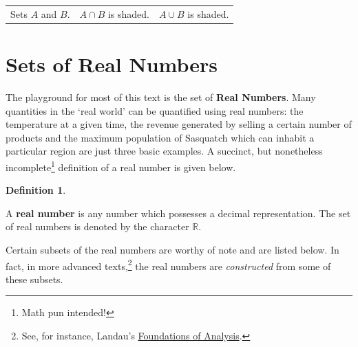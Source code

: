 \documentclass[11pt]{article}
\theoremstyle{definition}  %
\newtheorem{defn}{\bf Definition}
\newcommand{\bbm}{\begin{boxedminipage}{6.41in}}
\newcommand{\ebm}{\end{boxedminipage}}
\begin{document}
\begin{center}
\begin{tabular}{ccc}
\\

Sets $A$ and $B$. 



&

\hspace{0.15in}

$A \cap B$ is shaded.

&

\hspace{0.15in}

$A \cup B$ is shaded.

\\
\end{tabular}

\end{center}

\section{Sets of Real Numbers}
\label{SetsofRealNumbers}

The playground for most of this text is the set of \textbf{Real Numbers}.  Many quantities in the `real world' can be quantified using real numbers: the temperature at a given time, the revenue generated by selling a certain number of products and the maximum population of Sasquatch which can inhabit a particular region are just three basic examples.   A succinct, but nonetheless incomplete\footnote{Math pun intended!} definition of a real number is given below.

\medskip

\colorbox{ResultColor}{\bbm

\begin{defn} \label{realnumberdefn}

A \textbf{real number} is any number which possesses a decimal representation.  The set of real numbers is denoted by the character $\mathbb{R}$.  

\end{defn}

\ebm}

\medskip

Certain subsets of the real numbers are worthy of note and are listed below.  In fact, in more advanced texts,\footnote{See, for instance, Landau's \underline{Foundations of Analysis}.}   the real numbers are \textit{constructed} from some of these subsets.  

\medskip
\end{document}
